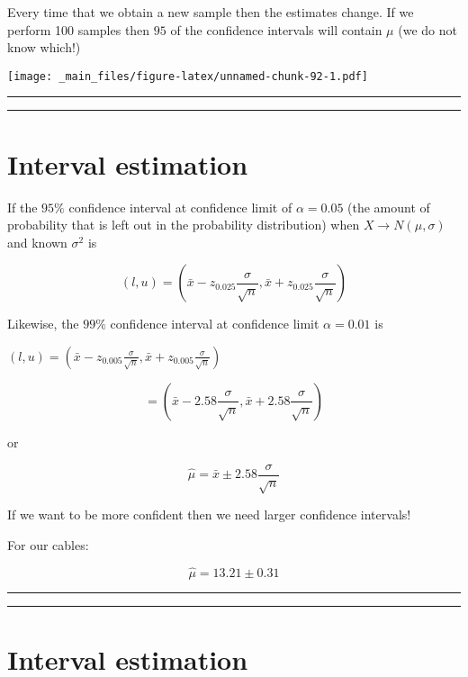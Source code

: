 \documentclass[
]{book}
\begin{document}
Every time that we obtain a new sample then the estimates change. If we perform 100 samples then \(95%
\) of the confidence intervals will contain \(\mu\) (we do not know which!)

\texttt{[image: \_main\_files/figure-latex/unnamed-chunk-92-1.pdf]}

\begin{center}\rule{0.5\linewidth}{0.5pt}\end{center}

\begin{center}\rule{0.5\linewidth}{0.5pt}\end{center}

\hypertarget{interval-estimation-7}{%
\section{Interval estimation}\label{interval-estimation-7}}

If the \(95\%\) confidence interval at confidence limit of \(\alpha=0.05%
\) (the amount of probability that is left out in the probability distribution) when \(X \rightarrow N(\mu, \sigma)\) and known \(\sigma^2\) is

\[(l,u) = (\bar{x} - z_{0.025}\frac{\sigma}{\sqrt{n}},\bar{x} +z_{0.025} \frac{\sigma}{\sqrt{n}})\]

Likewise, the \(99\%\) confidence interval at confidence limit \(\alpha=0.01\) is

\((l,u) = (\bar{x} - z_{0.005}\frac{\sigma}{\sqrt{n}},\bar{x} + z_{0.005}\frac{\sigma}{\sqrt{n}})\)

\[= (\bar{x} - 2.58\frac{\sigma}{\sqrt{n}},\bar{x} + 2.58\frac{\sigma}{\sqrt{n}})\]

or

\[\hat{\mu}=\bar{x} \pm 2.58\frac{\sigma}{\sqrt{n}}\]

If we want to be more confident then we need larger confidence intervals!

For our cables:

\[\hat{\mu}= 13.21 \pm 0.31\]

\begin{center}\rule{0.5\linewidth}{0.5pt}\end{center}

\begin{center}\rule{0.5\linewidth}{0.5pt}\end{center}

\hypertarget{interval-estimation-8}{%
\section{Interval estimation}\label{interval-estimation-8}}
\end{document}
